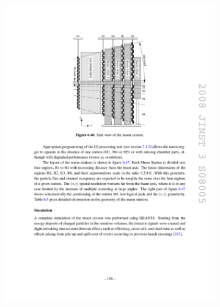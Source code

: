 \begin{figure}[!h]
    \centering
    \begin{subfigure}[m]{0.4\textwidth}
        \centering        
        \includegraphics[width=1.0\textwidth]{figs/Detector/muon_layout.pdf}
    \end{subfigure}
    \begin{subfigure}[m]{0.4\textwidth}
        \centering

\end{subfigure}
\end{figure}

